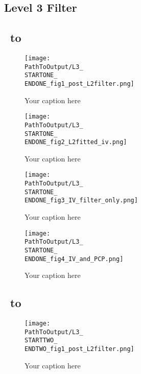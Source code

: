 \begin{appendix}
\newpage
\section{Level 3 Filter}\label{app:lvl3}
\subsection{\STARTONE\ to \ENDONE }

\begin{figure}[H] %
  \centering
  \texttt{[image: \\PathToOutput/L3\_\\STARTONE\_\\ENDONE\_fig1\_post\_L2filter.png]}%
  \caption{Your caption here}
 \label{fig:time1lvl3fig1}
\end{figure}


\begin{figure}[H] %
  \centering
  \texttt{[image: \\PathToOutput/L3\_\\STARTONE\_\\ENDONE\_fig2\_L2fitted\_iv.png]}%
  \caption{Your caption here}
  \label{fig:time1lvl3fig2}
\end{figure}


\begin{figure}[H] %
  \centering
  \texttt{[image: \\PathToOutput/L3\_\\STARTONE\_\\ENDONE\_fig3\_IV\_filter\_only.png]}%
  \caption{Your caption here}
 \label{fig:time1lvl3fig3}
\end{figure}


\begin{figure}[H] %
  \centering
  \texttt{[image: \\PathToOutput/L3\_\\STARTONE\_\\ENDONE\_fig4\_IV\_and\_PCP.png]}%
  \caption{Your caption here}
 \label{fig:time1lvl3fig4}
\end{figure}

\newpage
\subsection{\STARTTWO\ to \ENDTWO }

\begin{figure}[H] %
  \centering
  \texttt{[image: \\PathToOutput/L3\_\\STARTTWO\_\\ENDTWO\_fig1\_post\_L2filter.png]}%
  \caption{Your caption here}
  \label{fig:time2lvl3fig1}
\end{figure}



\end{appendix}
